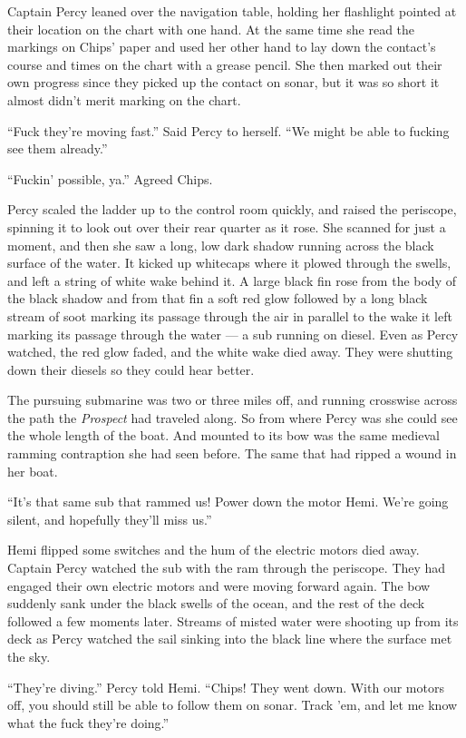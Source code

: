 \documentclass[
]{scrbook}
\begin{document}
Captain Percy leaned over the navigation table, holding her flashlight
pointed at their location on the chart with one hand. At the same time
she read the markings on Chips' paper and used her other hand to lay
down the contact's course and times on the chart with a grease pencil.
She then marked out their own progress since they picked up the contact
on sonar, but it was so short it almost didn't merit marking on the
chart.

``Fuck they're moving fast.'' Said Percy to herself. ``We might be able
to fucking see them already.''

``Fuckin' possible, ya.'' Agreed Chips.

Percy scaled the ladder up to the control room quickly, and raised the
periscope, spinning it to look out over their rear quarter as it rose.
She scanned for just a moment, and then she saw a long, low dark shadow
running across the black surface of the water. It kicked up whitecaps
where it plowed through the swells, and left a string of white wake
behind it. A large black fin rose from the body of the black shadow and
from that fin a soft red glow followed by a long black stream of soot
marking its passage through the air in parallel to the wake it left
marking its passage through the water --- a sub running on diesel. Even
as Percy watched, the red glow faded, and the white wake died away. They
were shutting down their diesels so they could hear better.

The pursuing submarine was two or three miles off, and running crosswise
across the path the \emph{Prospect} had traveled along. So from where
Percy was she could see the whole length of the boat. And mounted to its
bow was the same medieval ramming contraption she had seen before. The
same that had ripped a wound in her boat.

``It's that same sub that rammed us! Power down the motor Hemi. We're
going silent, and hopefully they'll miss us.''

Hemi flipped some switches and the hum of the electric motors died away.
Captain Percy watched the sub with the ram through the periscope. They
had engaged their own electric motors and were moving forward again. The
bow suddenly sank under the black swells of the ocean, and the rest of
the deck followed a few moments later. Streams of misted water were
shooting up from its deck as Percy watched the sail sinking into the
black line where the surface met the sky.

``They're diving.'' Percy told Hemi. ``Chips! They went down. With our
motors off, you should still be able to follow them on sonar. Track 'em,
and let me know what the fuck they're doing.''
\end{document}
